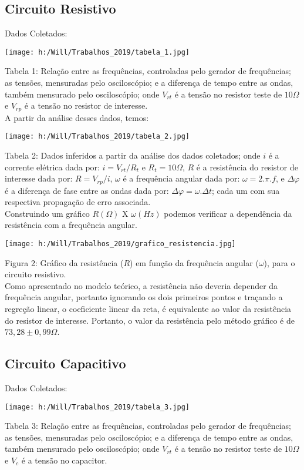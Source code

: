 \documentclass[a4paper, 12pt]{article}
\begin{document}
\begin{multicols}{2}
\subsection{Circuito Resistivo}
Dados Coletados:
\begin{center}
\begingroup
    \centering
    \texttt{[image: h:/Will/Trabalhos\_2019/tabela\_1.jpg]}
\endgroup
\end{center}
Tabela 1: Relação entre as frequências, controladas pelo gerador de frequências; as tensões, mensuradas pelo osciloscópio; e a diferença de tempo entre as ondas, também mensurado pelo osciloscópio; onde $V_{rt}$ é a tensão no resistor teste de $10 \Omega$ e $V_{rp}$ é a tensão no resistor de interesse. \\

A partir da análise desses dados, temos:
\begin{center}
\begingroup
    \centering
    \texttt{[image: h:/Will/Trabalhos\_2019/tabela\_2.jpg]}
\endgroup
\end{center}
Tabela 2: Dados inferidos a partir da análise dos dados coletados; onde $i$ é a corrente elétrica dada por: $i=V_{rt}/R_{t}$ e $R_{t}=10\Omega$, $R$ é a resistência do resistor de interesse dada por: $R=V_{rp}/i$, $\omega$ é a frequência angular dada por: $\omega=2.\pi . f$, e $\Delta \varphi$ é a diferença de fase entre as ondas dada por: $\Delta \varphi=\omega . \Delta t$; cada um com sua respectiva propagação de erro associada. \\

Construindo um gráfico $R(\Omega)$ X $\omega(Hz)$ podemos verificar a dependência da resistência com a frequência angular.
\begin{center}
\begingroup
    \centering
    \texttt{[image: h:/Will/Trabalhos\_2019/grafico\_resistencia.jpg]}
\endgroup
\end{center}
Figura 2: Gráfico da resistência ($R$) em função da frequência angular ($\omega$), para o circuito resistivo. \\

Como apresentado no modelo teórico, a resistência não deveria depender da frequência angular, portanto ignorando os dois primeiros pontos e traçando a regreção linear, o coeficiente linear da reta, é equivalente ao valor da resistência do resistor de interesse. Portanto, o valor da resistência pelo método gráfico é de $73,28 \pm 0,99 \Omega$.

\subsection{Circuito Capacitivo}
Dados Coletados:
\begin{center}
\begingroup
    \centering
    \texttt{[image: h:/Will/Trabalhos\_2019/tabela\_3.jpg]}
\endgroup
\end{center}
Tabela 3: Relação entre as frequências, controladas pelo gerador de frequências; as tensões, mensuradas pelo osciloscópio; e a diferença de tempo entre as ondas, também mensurado pelo osciloscópio; onde $V_{rt}$ é a tensão no resistor teste de $10 \Omega$ e $V_{c}$ é a tensão no capacitor. \\


\end{multicols}
\end{document}
